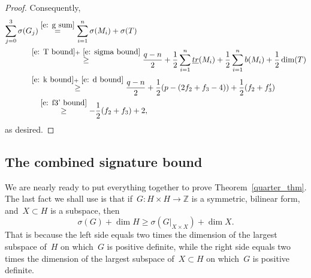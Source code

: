\documentclass[AHL,Unicode,longabstracts,published]{cedram}
\newcommand{\bbZ}{\mathbb{Z}}
\begin{document}
\begin{proof}
Consequently,
\begin{align*}
\sum_{j=0}^3 \sigma(G_j) &\overset{\eqref{e: g sum}}{=} \sum_{i=1}^n \sigma(M_i) + \sigma(T) \\
&\mkern-20mu\overset{\eqref{e: T bound} +~\eqref{e: sigma bound}}{\ge} \frac{q-n}{2} +
\frac12 \sum_{i=1}^n \underline{tr}(M_i) + \frac12 \sum_{i=1}^n b(M_i) + \frac12 \dim(T) \\
&\mkern-20mu\overset{\eqref{e: k bound} +~\eqref{e: d bound}}{\ge} \frac{q-n}{2} +
\frac12 (p - (2f_2 + f_3 - 4))+ \frac12 (f_2+f_3') \\
&\overset{\eqref{e: f3' bound}}{\ge} - \frac12 (f_2 +f_3) +2,
\end{align*}
as desired.
\end{proof}

\subsection{The combined signature bound}

We are nearly ready to put everything together to prove Theorem~\ref{quarter_thm}. The last fact we shall use is that if~$G : H \times H \to \bbZ$ is a symmetric, bilinear form, and~$X \subset H$ is a subspace, then
\begin{equation}\label{e: subspace bound}
\sigma(G) + \dim H \ge \sigma(G |_{X \times X}) + \dim X.
\end{equation}
That is because the left side equals two times the dimension of the largest subspace of~$H$ on which~$G$ is positive definite, while the right side equals two times the dimension of the largest subspace of~$X \subset H$ on which~$G$ is positive definite.
\end{document}
